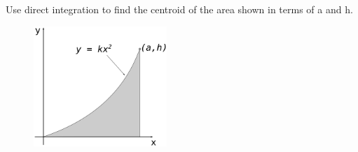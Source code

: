 
\noindent Use direct integration to find the centroid of the area shown in terms of a and h.  


\begin{figure}[ht!]
  \centering
  \includegraphics[height=1.8in]{fig.png}
\end{figure}


\iftoggle{flagSoln}{%
\vspace{.5cm}
\rule{\textwidth}{.4pt}
\vspace{.5cm}
\textbf{Solution:} 

Look up prabolic spandrel in the \textit{centroid of common shapes} figure/table (12th ed: Fig. 5.8A (12ed).
}{%
}%
